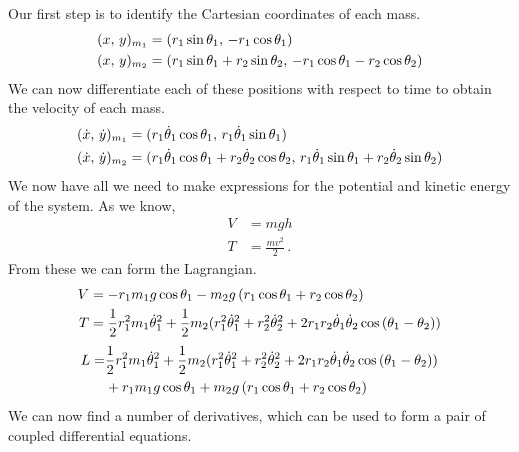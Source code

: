 \documentclass{article}
\begin{document}
Our first step is to identify the Cartesian coordinates of each mass.
\begin{align*}
    (x,\thinspace y)_{m_{1}} &= (r_{1}\sin{\theta_1} ,\thinspace -r_{1}\cos{\theta_{1}}) \\
    (x,\thinspace y)_{m_{2}} &= (r_{1}\sin{\theta_1} + r_{2}\sin{\theta_2},\thinspace -r_{1}\cos{\theta_{1}} - r_{2}\cos{\theta_{2}} )
\end{align*}
We can now differentiate each of these positions with respect to time to obtain the velocity of each mass.
\begin{align*}
   (\dot{x},\thinspace \dot{y})_{m_{1}} &= (r_{1}\dot{\theta}_{1}\cos{\theta_1} ,\thinspace r_{1}\dot{\theta}_{1}\sin{\theta_{1}}) \\
   (\dot{x},\thinspace \dot{y})_{m_{2}} &= (r_{1}\dot{\theta}_{1}\cos{\theta_1} + r_{2}\dot{\theta}_{2}\cos{\theta_{2}},\thinspace r_{1}\dot{\theta}_{1}\sin{\theta_{1}} + r_{2}\dot{\theta}_{2}\sin{\theta_{2}}) 
\end{align*}
We now have all we need to make expressions for the potential and kinetic energy of the system. As we know,
\begin{align*}
    V &= mgh \\
    T &= \frac{mv^2}{2} \, .
\end{align*}
From these we can form the Lagrangian.
\begin{align*}
    V &= -r_{1}m_{1}g\cos{\theta_{1}} - m_{2}g \thinspace (r_{1}\cos{\theta_{1}} + r_{2}\cos{\theta_{2}}) \\
    T &= \frac{1}{2} r_{1}^2 m_{1} \dot{\theta}_{1}^2 + \frac{1}{2}m_{2}(r_{1}^2 \dot{\theta}_{1}^2 + r_{2}^2 \dot{\theta}_{2}^2 + 2r_{1}r_{2}\dot{\theta}_{1}\dot{\theta}_{2}\cos{(\theta_{1}-\theta_{2})})
\end{align*}
\begin{align*}
 L = &\frac{1}{2} r_{1}^2 m_{1} \dot{\theta}_{1}^2 + \frac{1}{2}m_{2}(r_{1}^2 \dot{\theta}_{1}^2 + r_{2}^2 \dot{\theta}_{2}^2 + 2r_{1}r_{2}\dot{\theta}_{1}\dot{\theta}_{2}\cos{(\theta_{1}-\theta_{2})}) \\
&+ r_{1}m_{1}g\cos{\theta_{1}} + m_{2}g \thinspace (r_{1}\cos{\theta_{1}} + r_{2}\cos{\theta_{2}})
\end{align*}
 We can now find a number of derivatives, which can be used to form a pair of coupled differential equations.
\end{document}
